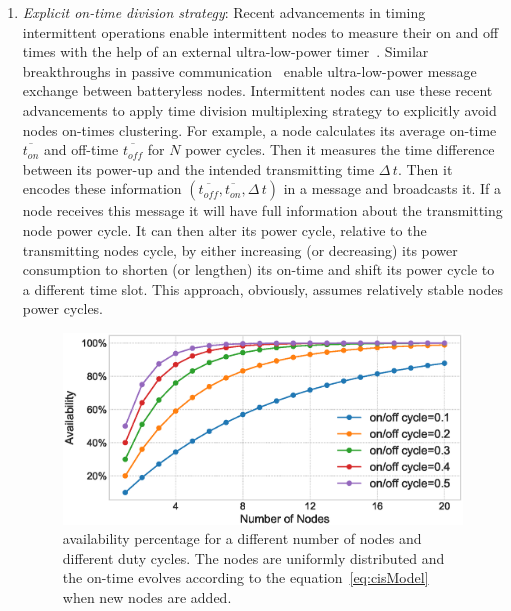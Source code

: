 \begin{enumerate}[label=\roman*.]%
%
		\item \textit{Explicit on-time division strategy}: Recent advancements in timing intermittent operations enable intermittent nodes to measure their on and off times with the help of an external ultra-low-power timer~\cite{mayfly2017hester}. Similar breakthroughs in passive communication~\cite{marco} enable ultra-low-power message exchange between batteryless nodes. Intermittent nodes can use these recent advancements to apply time division multiplexing strategy to explicitly avoid nodes on-times clustering. For example, a node calculates its average on-time $\overline{t_{on}}$ and off-time $\overline{t_{off}}$ for $N$ power cycles. Then it measures the time difference between its power-up and the intended transmitting time $\Delta\,t$. Then it encodes these information $({\overline{t_{off}}, \overline{t_{on}}, \Delta\,t})$ in a message and broadcasts it. If a node receives this message it will have full information about the transmitting node power cycle. It can then alter its power cycle, relative to the transmitting nodes cycle, by either increasing (or decreasing) its power consumption to shorten (or lengthen) its on-time and shift its power cycle to a different time slot. This approach, obviously, assumes relatively stable nodes power cycles. 
%
\begin{figure}
		\centering
		\includegraphics[width=\columnwidth]{figures/cisModel}
		\caption{\fullsys availability percentage for a different number of nodes and different duty cycles. The nodes are uniformly distributed and the \sys on-time evolves according to the equation~\ref{eq:cisModel} when new nodes are added.}
		\label{fig:cisModel}
\end{figure} 
%

\end{enumerate}
